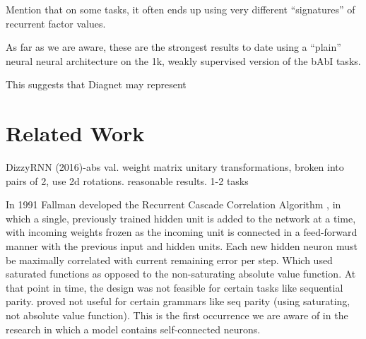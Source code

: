 \documentclass{article}
\begin{document}
Mention that on some tasks, it often ends up using very different “signatures” of recurrent factor values.

As far as we are aware, these are the strongest results to date using a “plain” neural neural architecture on the 1k, weakly supervised version of the bAbI tasks.

This suggests that Diagnet may represent 


\section{Related Work}
\label{gen_inst}



DizzyRNN (2016)-abs val. weight matrix unitary transformations, broken into pairs of 2, use 2d rotations. reasonable results. 1-2 tasks



In 1991 Fallman developed the Recurrent Cascade Correlation Algorithm \citet{Fahlman1990TheRC}, in which a single, previously trained hidden unit is added to the network at a time, with incoming weights frozen as the incoming unit is connected in a feed-forward manner with the previous input and hidden units. Each new hidden neuron must be maximally correlated with current remaining error per step.  
Which used saturated functions as opposed to the non-saturating absolute value function.  At that point in time, the design was not feasible for certain tasks like sequential parity.  proved not useful for certain grammars like seq parity (using saturating, not absolute value function). This is the first occurrence we are aware of in the research in which a model contains self-connected neurons.
\end{document}

